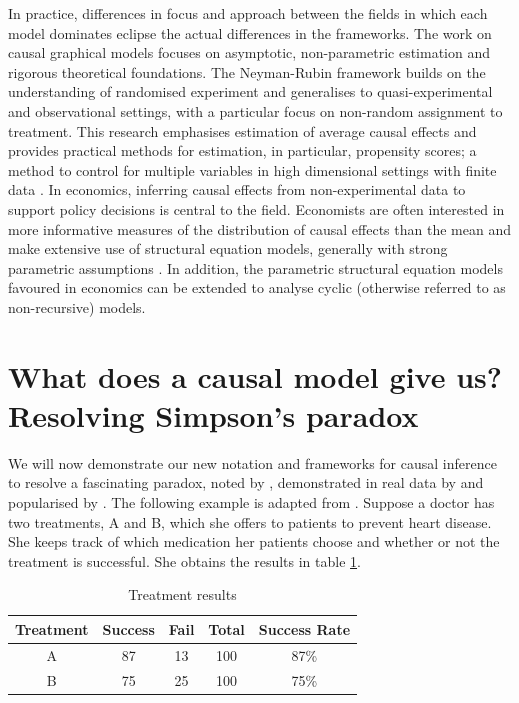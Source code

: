 \documentclass[11pt,a4paper,oneside]{book}
\theoremstyle{plain}
\theoremstyle{definition}
\begin{document}
In practice, differences in focus and approach between the fields in which each model dominates eclipse the actual differences in the frameworks. The work on causal graphical models \citep{Pearl2000,Sprites2000} focuses on asymptotic, non-parametric estimation and rigorous theoretical foundations. The Neyman-Rubin framework builds on the understanding of randomised experiment and generalises to quasi-experimental and observational settings, with a particular focus on non-random assignment to treatment. This research emphasises estimation of average causal effects and provides practical methods for estimation, in particular, propensity scores; a method to control for multiple variables in high dimensional settings with finite data \citep{Rosenbaum1983}. In economics, inferring causal effects from non-experimental data to support policy decisions is central to the field. Economists are often interested in more informative measures of the distribution of causal effects than the mean and make extensive use of structural equation models, generally with strong parametric assumptions \citep{Heckman2008}. In addition, the parametric structural equation models favoured in economics can be extended to analyse cyclic (otherwise referred to as non-recursive) models. 

\section{What does a causal model give us? Resolving Simpson's paradox}

We will now demonstrate our new notation and frameworks for causal inference to resolve a fascinating paradox, noted by \citet{yule1903notes}, demonstrated in real data by \citet{Cohen1934} and popularised by \citet{simpson1951interpretation}. The following example is adapted from \citet{Pearl2000}. Suppose a doctor has two treatments, A and B, which she offers to patients to prevent heart disease. She keeps track of which medication her patients choose and whether or not the treatment is successful. She obtains the results in table \ref{tab:simpson1}.

\begin{table}[h]
\caption{Treatment results}
\label{tab:simpson1}
\center
\begin{tabular}{c c c c c}
Treatment & Success & Fail & Total & Success Rate\\
\hline
\rowcolor[gray]{0.9} 
A &  87 & 13 & 100 & 87\%\\
\rowcolor{white} B & 75 & 25 & 100 & 75\%\\
\hline
\end{tabular}
\end{table}
\end{document}
